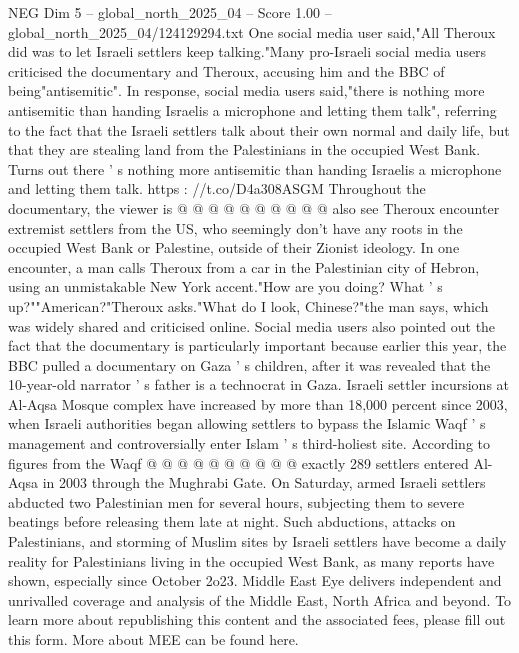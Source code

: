 \begin{textsample}{NEG Dim 5 – global\_north\_2025\_04 – Score 1.00 – global\_north\_2025\_04/124129294.txt}
One social media user said,"All Theroux did was to let Israeli settlers keep talking."Many pro-Israeli social media users criticised the documentary and Theroux, accusing him and the BBC of being"antisemitic".
In response, social media users said,"there is nothing more antisemitic than handing Israelis a microphone and letting them talk", referring to the fact that the Israeli settlers talk about their own normal and daily life, but that they are stealing land from the Palestinians in the occupied West Bank.
Turns out there ' s nothing more antisemitic than handing Israelis a microphone and letting them talk. https : //t.co/D4a308ASGM Throughout the documentary, the viewer is @ @ @ @ @ @ @ @ @ @ also see Theroux encounter extremist settlers from the US, who seemingly don't have any roots in the occupied West Bank or Palestine, outside of their Zionist ideology.
In one encounter, a man calls Theroux from a car in the Palestinian city of Hebron, using an unmistakable New York accent."How are you doing?
What ' s up?""American?"Theroux asks."What do I look, Chinese?"the man says, which was widely shared and criticised online.
Social media users also pointed out the fact that the documentary is particularly important because earlier this year, the BBC pulled a documentary on Gaza ' s children, after it was revealed that the 10-year-old narrator ' s father is a technocrat in Gaza.
Israeli settler incursions at Al-Aqsa Mosque complex have increased by more than 18,000 percent since 2003, when Israeli authorities began allowing settlers to bypass the Islamic Waqf ' s management and controversially enter Islam ' s third-holiest site.
According to figures from the Waqf @ @ @ @ @ @ @ @ @ @ exactly 289 settlers entered Al-Aqsa in 2003 through the Mughrabi Gate.
On Saturday, armed Israeli settlers abducted two Palestinian men for several hours, subjecting them to severe beatings before releasing them late at night.
Such abductions, attacks on Palestinians, and storming of Muslim sites by Israeli settlers have become a daily reality for Palestinians living in the occupied West Bank, as many reports have shown, especially since October 2o23.
Middle East Eye delivers independent and unrivalled coverage and analysis of the Middle East, North Africa and beyond.
To learn more about republishing this content and the associated fees, please fill out this form.
More about MEE can be found here.

\end{textsample}
